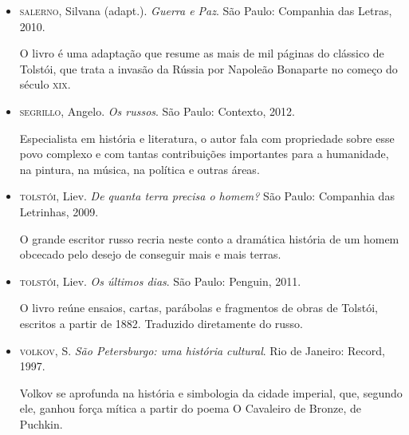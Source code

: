 \documentclass[12pt]{extarticle}
\begin{document}
\begin{itemize}
\item\textsc{salerno}, Silvana (adapt.). \textit{Guerra e Paz}. 
São Paulo: Companhia das Letras, 2010.

O livro é uma adaptação que resume as mais de mil páginas do clássico de
Tolstói, que trata a invasão da Rússia por Napoleão Bonaparte no começo
do século \textsc{xix}.

\item\textsc{segrillo}, Angelo. \textit{Os russos}. São Paulo: Contexto, 2012.

Especialista em história e literatura, o autor fala com propriedade
sobre esse povo complexo e com tantas contribuições importantes para a
humanidade, na pintura, na música, na política e outras áreas.

\item\textsc{tolstói}, Liev. \textit{De quanta terra precisa o homem?} São Paulo:
Companhia das Letrinhas, 2009.

O grande escritor russo recria neste conto a dramática história de um
homem obcecado pelo desejo de conseguir mais e mais terras.

\item\textsc{tolstói}, Liev. \textit{Os últimos dias}. São Paulo: Penguin, 2011.

O livro reúne ensaios, cartas, parábolas e fragmentos de obras de
Tolstói, escritos a partir de 1882. Traduzido diretamente do russo.

\item\textsc{volkov}, S. \textit{São Petersburgo: uma história cultural}. Rio de
Janeiro: Record, 1997.

Volkov se aprofunda na história e simbologia da cidade imperial, que,
segundo ele, ganhou força mítica a partir do poema O Cavaleiro de
Bronze, de Puchkin.
\end{itemize}
\end{document}
